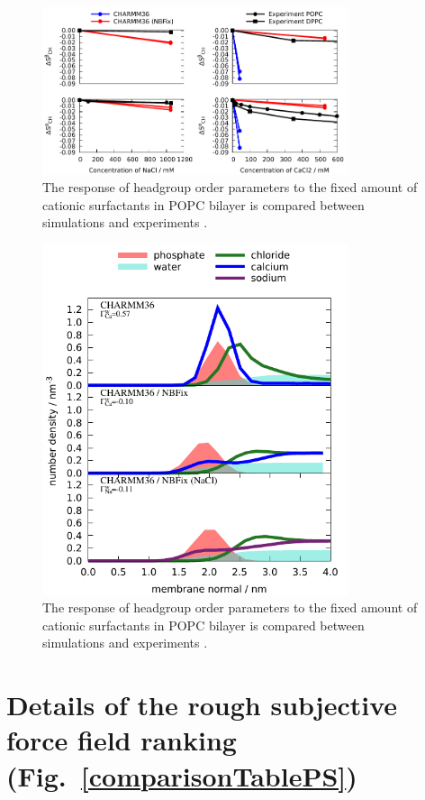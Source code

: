 \documentclass[aps,prl,superscriptaddress,twocolumn]{revtex4}
\begin{document}
\begin{figure}[]
  \centering
  \includegraphics[width=9.0cm]{../Figs/OP_CHARMM_CaCl_POPC_NBFix.pdf}
  \caption{\label{OP_CHARMM_CaCl_POPC_NBFix}
  The response of headgroup order parameters to the fixed amount of cationic surfactants in
  POPC bilayer is compared between simulations and experiments \cite{scherer89}.}
\end{figure}

\begin{figure}[]
  \centering
  \includegraphics[width=9.0cm]{../Figs/density_profile_CHARMM_CaCl_POPC_NBFix.pdf}
  \caption{\label{density_profile_CHARMM_CaCl_POPC_NBFix}
  The response of headgroup order parameters to the fixed amount of cationic surfactants in
  POPC bilayer is compared between simulations and experiments \cite{scherer89}.}
\end{figure}

\pagebreak
\section{Details of the rough subjective force field ranking (Fig.~\ref{comparisonTablePS})} 
\end{document}
